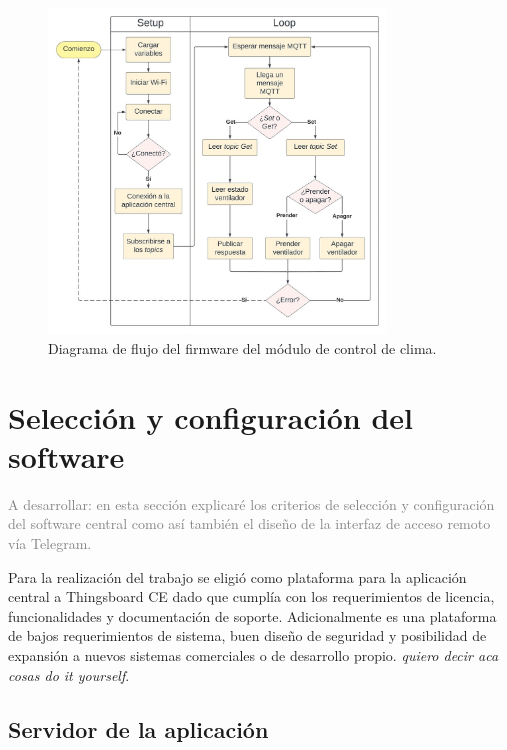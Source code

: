 \begin{figure}[!h]
	\centering
	\includegraphics[width=0.8\textwidth]{./Figures/chapter3/FirmwareVentControl.jpg}
	\caption[Diagrama de flujo del firmware del módulo de control de clima]{Diagrama de flujo del firmware del módulo de control de clima.}
	\label{fig:flow_climacontrol}
\end{figure}










\pagebreak
\section{Selección y configuración del software}
\label{sec:Selección y configuración del software}

\textcolor{gray}{A desarrollar: en esta sección explicaré los criterios de selección y configuración del software central como así también el diseño de la interfaz de acceso remoto vía Telegram. }



Para la realización del trabajo se eligió como plataforma para la aplicación central a Thingsboard CE dado que cumplía con los requerimientos de licencia, funcionalidades y documentación de soporte.
Adicionalmente es una plataforma de bajos requerimientos de sistema, buen diseño de seguridad y posibilidad de expansión a nuevos sistemas comerciales o de desarrollo propio. \textit{quiero decir aca cosas do it yourself}.

\subsection{Servidor de la aplicación}
\label{sec:Servidor de la aplicación}

